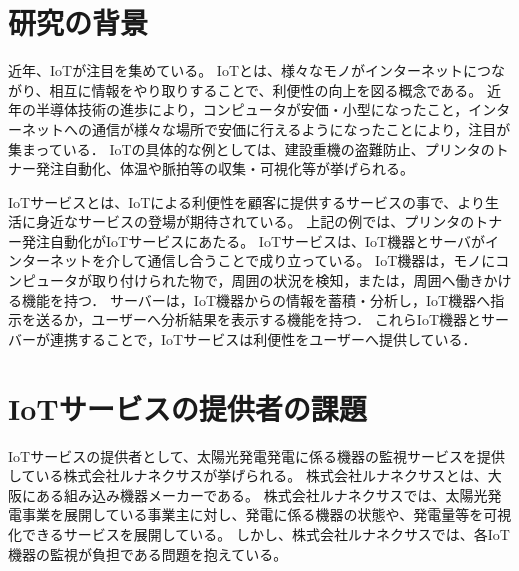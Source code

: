 \begin{comment}
IoTサービスというものがある。
IoTサービスはこんな構造をしている。
だけど、IoTサービスの開発・運用は大変
・開発者が開発するのが大変
・運用者が維持することが大変

なので、監視が必要です。

本論文では、〇〇と△△といった方法で、監視システムを開発することにより、
IoTサービスの開発者と運用者の負担を軽減する事を目指す。
\end{comment}



\section{研究の背景}
近年、IoTが注目を集めている。
IoTとは、様々なモノがインターネットにつながり、相互に情報をやり取りすることで、利便性の向上を図る概念である。
近年の半導体技術の進歩により，コンピュータが安価・小型になったこと，インターネットへの通信が様々な場所で安価に行えるようになったことにより，注目が集まっている．
IoTの具体的な例としては、建設重機の盗難防止、プリンタのトナー発注自動化、体温や脈拍等の収集・可視化等が挙げられる。
\medskip

IoTサービスとは、IoTによる利便性を顧客に提供するサービスの事で、より生活に身近なサービスの登場が期待されている。
上記の例では、プリンタのトナー発注自動化がIoTサービスにあたる。
IoTサービスは、IoT機器とサーバがインターネットを介して通信し合うことで成り立っている。
IoT機器は，モノにコンピュータが取り付けられた物で，周囲の状況を検知，または，周囲へ働きかける機能を持つ．
サーバーは，IoT機器からの情報を蓄積・分析し，IoT機器へ指示を送るか，ユーザーへ分析結果を表示する機能を持つ．
これらIoT機器とサーバーが連携することで，IoTサービスは利便性をユーザーへ提供している．

\section{IoTサービスの提供者の課題}
IoTサービスの提供者として、太陽光発電発電に係る機器の監視サービスを提供している株式会社ルナネクサスが挙げられる。
株式会社ルナネクサスとは、大阪にある組み込み機器メーカーである。
株式会社ルナネクサスでは、太陽光発電事業を展開している事業主に対し、発電に係る機器の状態や、発電量等を可視化できるサービスを展開している。
しかし、株式会社ルナネクサスでは、各IoT機器の監視が負担である問題を抱えている。

\begin{comment}
\begin{itemize}
\item IoT機器が接続されるネットワークの構成は様々であり、接続されるネットワークの変更も出来ないことが多い。
\item IoTサービスが提供する機能と、ネットワークや機器の状態の監視は別機能である為、IoTサービスに組み込む事は困難である。
\item IoT機器は安価であるため、大量に使用される。そのため、設定が困難である。
\end{itemize}
\end{comment}

